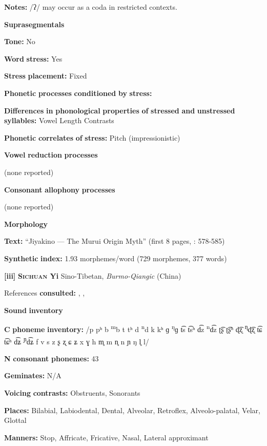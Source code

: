 \begin{styleBody}
\textbf{Notes:} /ʔ/ may occur as a coda in restricted contexts.

\textbf{Suprasegmentals}

\textbf{Tone:} No

\textbf{Word} \textbf{stress:} Yes

\textbf{Stress} \textbf{placement:} Fixed

\textbf{Phonetic} \textbf{processes} \textbf{conditioned} \textbf{by} \textbf{stress:}

\textbf{Differences} \textbf{in} \textbf{phonological} \textbf{properties} \textbf{of} \textbf{stressed} \textbf{and} \textbf{unstressed} \textbf{syllables:} Vowel Length Contrasts

\textbf{Phonetic} \textbf{correlates} \textbf{of} \textbf{stress:} Pitch (impressionistic)

\textbf{Vowel} \textbf{reduction} \textbf{processes}

(none reported)

\textbf{Consonant} \textbf{allophony} \textbf{processes}

(none reported)

\textbf{Morphology}

\textbf{Text:} “Jiyakino — The Murui Origin Myth” (first 8 pages, \citealt{Wojtylak2017}: 578-585)

\textbf{Synthetic} \textbf{index:} 1.93 morphemes/word (729 morphemes, 377 words)

\textbf{[iii]}   \textbf{\textsc{Sichuan} \textbf{Yi}}  Sino-Tibetan, \textit{Burmo-Qiangic} (China)

References \textbf{consulted:} \citet{Gerner2013}, \citet{Maoji1997}, \citet{Merrifield2012}

\textbf{Sound} \textbf{inventory}

\textbf{C} \textbf{phoneme} \textbf{inventory:} /p pʰ b \textsuperscript{m}b t tʰ d \textsuperscript{n}d k kʰ ɡ \textsuperscript{ŋ}ɡ t͡s t͡sʰ d͡z \textsuperscript{n}d͡z ʈ͡ʂ ʈ͡ʂʰ ɖ͡ʐ \textsuperscript{ɳ}ɖ͡ʐ t͡ɕ t͡ɕʰ d͡ʑ \textsuperscript{ɲ}d͡ʑ f v s z ʂ ʐ ɕ ʑ x ɣ h m̥ m n̥ n ɲ ŋ l̥ l/

\textbf{N} \textbf{consonant} \textbf{phonemes:} 43

\textbf{Geminates:} N/A

\textbf{Voicing} \textbf{contrasts:} Obstruents, Sonorants

\textbf{Places:} Bilabial, Labiodental, Dental, Alveolar, Retroflex, Alveolo-palatal, Velar, Glottal

\textbf{Manners:} Stop, Affricate, Fricative, Nasal, Lateral approximant


\end{styleBody}
